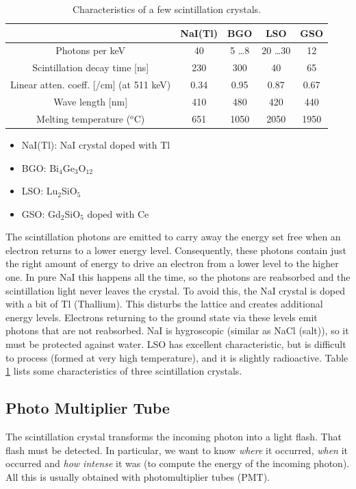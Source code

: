 \documentclass[11pt,oneside]{book}
\begin{document}
\begin{table}
\centering
\caption{Characteristics of a few scintillation crystals.}
\label{tab:crystals}
\begin{tabular}{|c|c|c|c|c|}
\hline
       & NaI(Tl) &    BGO      & LSO      & GSO \\
\hline
Photons per keV                    
        &  40     & 5 \ldots 8  & 20 \ldots 30 &  12\\
Scintillation decay time [ns]
        & 230     &  300  & 40  & 65 \\
Linear atten. coeff. [/cm] (at 511 keV)
        & 0.34    & 0.95  & 0.87  & 0.67\\
 Wave length [nm]
        & 410     & 480   & 420 & 440 \\
Melting temperature ($^o$C)
        & 651 & 1050 & 2050 & 1950 \\
\hline
\end{tabular}
\begin{itemize}
\item NaI(Tl): NaI crystal doped with Tl
\item BGO: Bi$_4$Ge$_{3}$O$_{12}$
\item LSO: Lu$_2$SiO$_5$
\item GSO: Gd$_2$SiO$_5$ doped with Ce
\end{itemize}
\end{table}

The scintillation photons are emitted to carry away the energy set
free when an electron returns to a lower energy level. Consequently,
these photons contain just the right amount of energy to drive an
electron from a lower level to the higher one. In pure NaI this
happens all the time, so the photons are reabsorbed and the
scintillation light never leaves the crystal. To avoid this, the NaI
crystal is doped with a bit of Tl (Thallium). This disturbs the
lattice and creates additional energy levels. Electrons returning to
the ground state via these levels emit photons that are not
reabsorbed.  NaI is hygroscopic (similar as NaCl (salt)), so it must
be protected against water. LSO has excellent characteristic, but is
difficult to process (formed at very high temperature), and it is
slightly radioactive. Table \ref{tab:crystals} lists some
characteristics of three scintillation crystals.

\subsection{Photo Multiplier Tube}
The scintillation crystal transforms the incoming photon into a light flash.
That flash must be detected. In particular, we want to know {\em where} it
occurred, {\em when} it occurred and {\em how intense} it was (to compute the
energy of the incoming photon). All this is usually obtained with
photomultiplier tubes (PMT).
\end{document}
